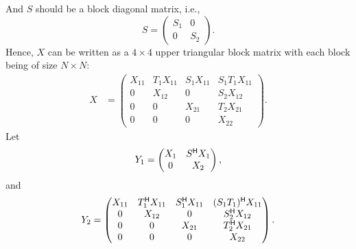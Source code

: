 And  $S$ should be a block diagonal matrix, i.e.,
\begin{equation*}
  S=
  \begin{pmatrix}
    S_1 & 0\\
    0& S_2
  \end{pmatrix}.
\end{equation*}
Hence, $X$ can  be written as a $4\times 4$ upper  triangular block matrix with each block being of size $N\times N$:
\begin{equation}
  \label{eq:16}
  \begin{split}
  X & =
  \begin{pmatrix}
    X_{11} & T_1 X_{11} & S_1X_{11} & S_1T_1 X_{11}\\
    0 & X_{12} & 0 & S_2X_{12}\\
    0 & 0& X_{21} & T_2 X_{21}\\
    0 & 0 & 0& X_{22}
  \end{pmatrix}.
  \end{split}
\end{equation}
Let
\begin{equation}
  \label{multiSPPTfinal2:eq:1}
   Y_1 =
  \begin{pmatrix}
    X_1 &S^{\mathsf{H}}X_1\\
    0 & X_2
  \end{pmatrix},
\end{equation}
and 
\begin{equation*}
  Y_2 =
  \begin{pmatrix}
    X_{11} & T^{\mathsf{H}}_1 X_{11} & S^{\mathsf{H}}_1X_{11} & (S_1T_1)^{\mathsf{H}} X_{11}\\
    0 & X_{12} & 0 & S^{\mathsf{H}}_2X_{12}\\
    0 & 0& X_{21} & T^{\mathsf{H}}_2 X_{21}\\
    0 & 0 & 0& X_{22}
  \end{pmatrix}.
\end{equation*}

